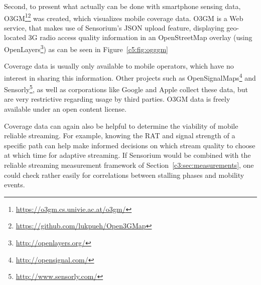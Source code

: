 Second, to present what actually can be done with smartphone sensing data, \gls{O3GM}\footnote{\url{https://o3gm.cs.univie.ac.at/o3gm/}}\footnote{\url{https://github.com/lukpueh/Open3GMap}} was created, which visualizes mobile coverage data. \gls{O3GM} is a Web service, that makes use of Sensorium's \acrshort{JSON} upload feature, displaying geo-located \gls{3G} radio access quality information in an OpenStreetMap overlay (using OpenLayers\footnote{\url{http://openlayers.org/}}) as can be seen in Figure~\ref{c5:fig:ogggm}

Coverage data is usually only available to mobile operators, which have no interest in sharing this information. Other projects such as OpenSignalMaps\footnote{\url{http://opensignal.com/}} and Sensorly\footnote{\url{http://www.sensorly.com/}}, as well as corporations like Google and Apple collect these data, but are very restrictive regarding usage by third parties. \gls{O3GM} data is freely available under an open content license.

Coverage data can again also be helpful to determine the viability of mobile reliable streaming. For example, knowing the \gls{RAT} and signal strength of a specific path can help make informed decisions on which stream quality to choose at which time for adaptive streaming. If Sensorium would be combined with the reliable streaming measurement framework of Section~\ref{c3:sec:measurements}, one could check rather easily for correlations between stalling phases and mobility events.






